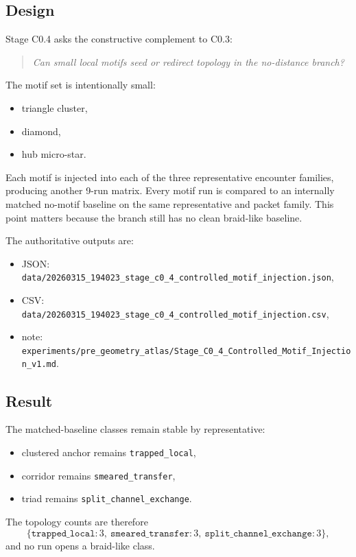 \documentclass[11pt]{article}
\begin{document}
\subsection{Design}

Stage C0.4 asks the constructive complement to C0.3:
\begin{quote}
\emph{Can small local motifs seed or redirect topology in the no-distance branch?}
\end{quote}

The motif set is intentionally small:
\begin{itemize}
\item triangle cluster,
\item diamond,
\item hub micro-star.
\end{itemize}

Each motif is injected into each of the three representative encounter families, producing another 9-run matrix. Every motif run is compared to an internally matched no-motif baseline on the same representative and packet family. This point matters because the branch still has no clean braid-like baseline.

The authoritative outputs are:
\begin{itemize}
\item JSON: \texttt{data/20260315\_194023\_stage\_c0\_4\_controlled\_motif\_injection.json},
\item CSV: \texttt{data/20260315\_194023\_stage\_c0\_4\_controlled\_motif\_injection.csv},
\item note: \texttt{experiments/pre\_geometry\_atlas/Stage\_C0\_4\_Controlled\_Motif\_Injection\_v1.md}.
\end{itemize}

\subsection{Result}

The matched-baseline classes remain stable by representative:
\begin{itemize}
\item clustered anchor remains \texttt{trapped\_local},
\item corridor remains \texttt{smeared\_transfer},
\item triad remains \texttt{split\_channel\_exchange}.
\end{itemize}

The topology counts are therefore
\begin{equation}
\{\texttt{trapped\_local}:3,\ \texttt{smeared\_transfer}:3,\ \texttt{split\_channel\_exchange}:3\},
\end{equation}
and no run opens a braid-like class.
\end{document}
